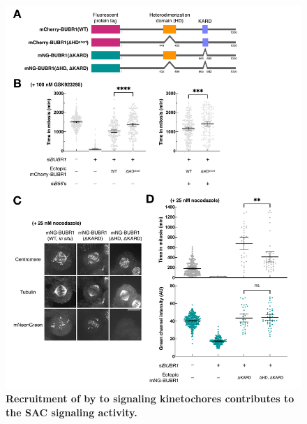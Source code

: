 \begin{figure}
    \centering
    \includegraphics[width=\textwidth]{chapters/figures/RescueExperiment.pdf}
    \caption{\textbf{Recruitment of  by  to signaling kinetochores  contributes to the SAC signaling activity.}}
    \label{RescueExperiment}
\end{figure}
